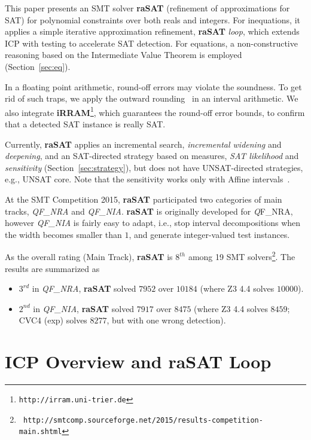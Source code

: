 \documentclass[runningheads,a4paper,oribibl]{llncs}
\begin{document}
This paper presents an SMT solver {\bf raSAT}
(refinement of approximations for SAT) for polynomial constraints over
both reals and integers. 
For inequations, it applies a simple iterative approximation refinement,
{\bf raSAT} {\em loop}, which extends ICP with testing to accelerate
SAT detection.
For equations, a non-constructive reasoning based on the Intermediate
Value Theorem is employed (Section~\ref{sec:eq}).

In a floating point arithmetic, round-off errors may violate the soundness.
To get rid of such traps, we apply the outward rounding~\cite{Hickey:2001:IAP:502102.502106}
in an interval arithmetic. 
We also integrate {\bf iRRAM}\footnote{\tt http://irram.uni-trier.de}, 
which guarantees the round-off error bounds,
to confirm that a detected SAT instance is really SAT. 

Currently, {\bf raSAT} applies an incremental search, 
{\em incremental widening} and {\em deepening}, 
and an SAT-directed strategy based on measures, 
{\em SAT likelihood} and {\em sensitivity} (Section~\ref{sec:strategy}),
but does not have UNSAT-directed strategies, e.g., UNSAT core. 
Note that the sensitivity works only with Affine
intervals~\cite{Ngoc:2009:ORE:1685167.1685421}.

At the SMT Competition 2015, 
\textbf{raSAT} participated two categories of main tracks,
\emph{QF\_NRA} and \emph{QF\_NIA}.
{\bf raSAT} is originally developed for {\emph QF\_NRA},
however \emph{QF\_NIA} is fairly easy to adapt,
i.e., stop interval decompositions when the width becomes smaller than $1$,
and generate integer-valued test instances. 

As the overall rating (Main Track), 
{\bf raSAT} is $8^{th}$ among 19 SMT solvers\footnote{\tt %
http://smtcomp.sourceforge.net/2015/results-competition-main.shtml}.
The results are summarized as 
\begin{itemize}
\item $3^{rd}$ in \emph{QF\_NRA}, \textbf{raSAT} solved $7952$ over $10184$
(where Z3 4.4 solves $10000$). 
\item $2^{nd}$ in \emph{QF\_NIA}, \textbf{raSAT} solved $7917$ over $8475$
  (where Z3 4.4 solves $8459$; CVC4 (exp) solves $8277$, 
  but with one wrong detection).
\end{itemize}

\section{ICP Overview and \textbf{raSAT} Loop}
\label{sec:raSATloop} 
\end{document}
